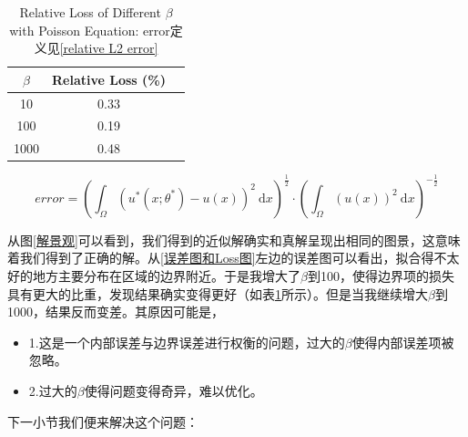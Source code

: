 \documentclass{article}
\begin{document}
\begin{table}[ht]
\centering  
\caption{Relative Loss of Different $\beta$ with Poisson Equation: error定义见\ref{relative L2 error}}
\label{比较不同系数}
\begin{tabular}{ccc} 
	\toprule
	$\beta$ & Relative Loss (\%) \\
	\hline
	10 & 0.33 \\
	\hline
	100 & 0.19 \\
	\hline
	1000 & 0.48 \\
	\bottomrule
\end{tabular}
\end{table}

\begin{equation}\label{relative L2 error}
error =  \left(\int_{\Omega}\left(u^{*}\left(x ; \theta^{*}\right)-u(x)\right)^{2} \mathrm{~d} x\right)^{\frac{1}{2}} \cdot\left(\int_{\Omega}(u(x))^{2} \mathrm{~d} x\right)^{-\frac{1}{2}}
\end{equation}

从图\ref{解景观}可以看到，我们得到的近似解确实和真解呈现出相同的图景，这意味着我们得到了正确的解。从\ref{误差图和Loss图}左边的误差图可以看出，拟合得不太好的地方主要分布在区域的边界附近。于是我增大了$\beta$到100，使得边界项的损失具有更大的比重，发现结果确实变得更好（如表\ref{比较不同系数}所示）。但是当我继续增大$\beta$到1000，结果反而变差。其原因可能是，
\begin{itemize}
\item 1.这是一个内部误差与边界误差进行权衡的问题，过大的$\beta$使得内部误差项被忽略。
\item 2.过大的$\beta$使得问题变得奇异，难以优化。
\end{itemize}
下一小节我们便来解决这个问题：
\end{document}
